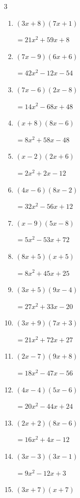 \begin{multicols}{3}
\begin{enumerate}
        $=40x^{2}+9x-9$

\columnbreak %

\resetques

  \item $(3x+8)(7x+1)$

        $=21x^{2}+59x+8$

  \item $(7x-9)(6x+6)$

        $=42x^{2}-12x-54$

  \item $(7x-6)(2x-8)$

        $=14x^{2}-68x+48$

  \item $(x+8)(8x-6)$

        $=8x^{2}+58x-48$

  \item $(x-2)(2x+6)$

        $=2x^{2}+2x-12$

  \item $(4x-6)(8x-2)$

        $=32x^{2}-56x+12$

  \item $(x-9)(5x-8)$

        $=5x^{2}-53x+72$

  \item $(8x+5)(x+5)$

        $=8x^{2}+45x+25$

  \item $(3x+5)(9x-4)$

        $=27x^{2}+33x-20$

  \item $(3x+9)(7x+3)$

        $=21x^{2}+72x+27$

  \item $(2x-7)(9x+8)$

        $=18x^{2}-47x-56$

  \item $(4x-4)(5x-6)$

        $=20x^{2}-44x+24$

  \item $(2x+2)(8x-6)$

        $=16x^{2}+4x-12$

  \item $(3x-3)(3x-1)$

        $=9x^{2}-12x+3$

  \item $(3x+7)(x+7)$


\end{enumerate}
\end{multicols}
